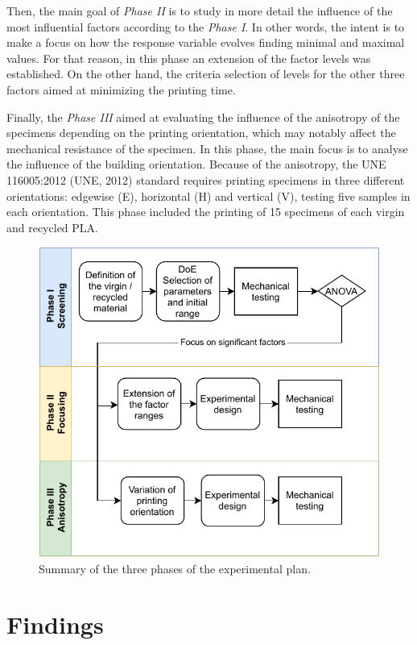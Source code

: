\documentclass[conference,final,]{IEEEtran}
\begin{document}
Then, the main goal of \emph{Phase II} is to study in more detail the
influence of the most influential factors according to the \emph{Phase
I}. In other words, the intent is to make a focus on how the response
variable evolves finding minimal and maximal values. For that reason, in
this phase an extension of the factor levels was established. On the
other hand, the criteria selection of levels for the other three factors
aimed at minimizing the printing time.

Finally, the \emph{Phase III} aimed at evaluating the influence of the
anisotropy of the specimens depending on the printing orientation, which
may notably affect the mechanical resistance of the specimen. In this
phase, the main focus is to analyse the influence of the building
orientation. Because of the anisotropy, the UNE 116005:2012 (UNE, 2012)
standard requires printing specimens in three different orientations:
edgewise (E), horizontal (H) and vertical (V), testing five samples in
each orientation. This phase included the printing of 15 specimens of
each virgin and recycled PLA.

\begin{figure}

{\centering \includegraphics[width=0.8\linewidth]{Figures/Methodology} 

}

\caption{Summary of the three phases of the experimental plan.\label{fig:methodology}}\label{fig:Fig.Methodology}
\end{figure}

\hypertarget{findings}{%
\section{Findings}\label{findings}}
\end{document}
